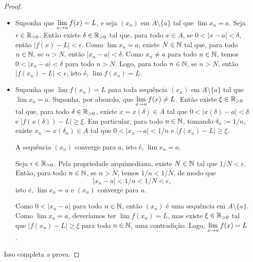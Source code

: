 \begin{proof}
    \leavevmode
        \begin{itemize}[align=left]
            \item[($\Rightarrow$)] Suponha que $\displaystyle \lim_{x \to a} f(x) = L$, e seja $(x_n)$ em $A \setminus \{a\}$ tal que $\lim x_n = a$. Seja $\epsilon \in \mathbb{R}_{>0}$. Então existe $\delta \in \mathbb{R}_{>0}$ tal que, para todo $x \in A$, se $0<|x-a|<\delta$, então $|f(x) - L|<\epsilon$. Como $\lim x_n = a$, existe $N \in \mathbb{N}$ tal que, para todo $n \in \mathbb{N}$, se $n > N$, então $|x_n - a| < \delta$. Como $x_n \neq a$ para todo $n \in \mathbb{N}$, temos $0<|x_n - a| < \delta$ para todo $n > N$. Logo, para todo $n \in \mathbb{N}$, se $n > N$, então $|f(x_n) - L| < \epsilon$, isto é, $\lim f(x_n) = L$.
            \item[($\Leftarrow$)] Suponha que $\lim f(x_n) = L$ para toda sequência $(x_n)$ em $A \setminus \{a\}$ tal que $\lim x_n = a$. Suponha, por absurdo, que $\displaystyle \lim_{x \to a} f(x) \neq L$. Então existe $\xi \in \mathbb{R}_{>0}$ tal que, para todo $\delta \in \mathbb{R}_{>0}$, existe $x = x(\delta) \in A$ tal que $0<|x(\delta)-a|<\delta$ e $|f(x(\delta))-L| \geq \xi$. Em particular, para todo $n \in \mathbb{N}$, tomando $\delta_n := 1/n$, existe $x_n := x(\delta_n) \in A$ tal que $0<|x_n - a|< 1/n$ e $|f(x_n)-L| \geq \xi$.
                \begin{claim}
                    A sequência $(x_n)$ converge para $a$, isto é, $\lim x_n = a$.
                \end{claim}
                \begin{midproof}
                    Seja $\epsilon \in \mathbb{R}_{>0}$. Pela propriedade arquimediana, existe $N \in \mathbb{N}$ tal que $1/N < \epsilon$. Então, para todo $n \in \mathbb{N}$, se $n > N$, temos $1/n < 1/N$, de modo que
                        \[
                            |x_n - a| < 1/n < 1/N < \epsilon,
                        \]
                    isto é, $\lim x_n = a$ e $(x_n)$ converge para $a$. \whiteproof
                \end{midproof}
            Como $0<|x_n - a|$ para todo $n \in \mathbb{N}$, então $(x_n)$ é uma sequência em $A \setminus \{a\}$. Como $\lim x_n = a$, deveríamos ter $\lim f(x_n) = L$, mas existe $\xi \in \mathbb{R}_{>0}$ tal que $|f(x_n)-L| \geq \xi$ para todo $n \in \mathbb{N}$, uma contradição. Logo, $\displaystyle \lim_{x \to a} f(x) = L$.
        \end{itemize}
    Isso completa a prova. \blackproof
\end{proof}


